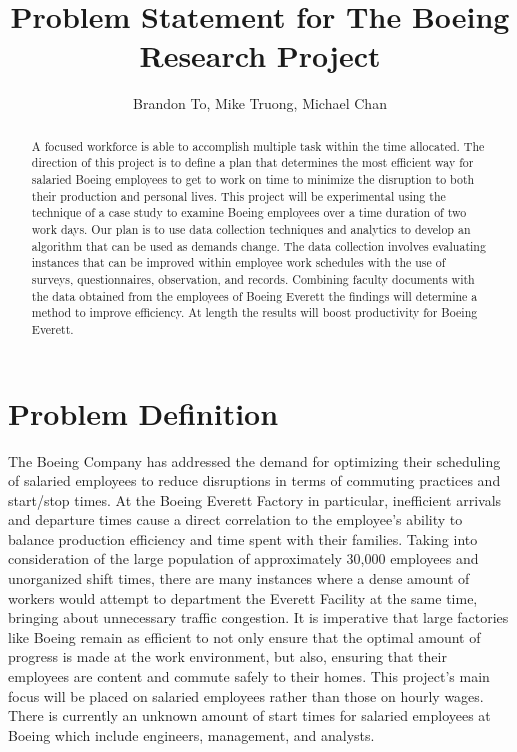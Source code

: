 \documentclass[journal, 11pt, letterpaper]{IEEEtran}
\title{Problem Statement for The Boeing Research Project{}}
\author{Brandon To, Mike Truong, Michael Chan}
\newcommand\tab[1][1cm]{\hspace*{#1}}
\begin{document}
\clearpage\maketitle
\thispagestyle{empty}


\begin{abstract}
\tab A focused workforce is able to accomplish multiple task within the time allocated. The direction of this project is to define a plan that determines the most efficient way for salaried Boeing employees to get to work on time to minimize the disruption to both their production and personal lives. This project will be experimental using the technique of a case study to examine Boeing employees over a time duration of two work days. 
Our plan is to use data collection techniques and analytics to develop an algorithm that can be used as demands change. 
The data collection involves evaluating instances that can be improved within employee work schedules with the use of surveys, questionnaires, observation, and records. 
Combining faculty documents with the data obtained from the employees of Boeing Everett the findings will determine a method to improve efficiency. At length the results will boost productivity for Boeing Everett. 
\end{abstract}


\newpage
\clearpage
\thispagestyle{empty}
\tableofcontents
\newpage


\setcounter{page}{1}




\section{Problem Definition}
\tab The Boeing Company has addressed the demand for optimizing their scheduling of salaried employees to reduce disruptions in terms of commuting practices and start/stop times. At the Boeing Everett Factory in particular, inefficient arrivals and departure times cause a direct correlation to the employee’s ability to balance production efficiency and time spent with their families.
Taking into consideration of the large population of approximately 30,000 employees and unorganized shift times, there are many instances where a dense amount of workers would attempt to department the Everett Facility at the same time, bringing about unnecessary traffic congestion.
It is imperative that large factories like Boeing remain as efficient to not only ensure that the optimal amount of progress is made at the work environment, but also, ensuring that their employees are content and commute safely to their homes.
\tab This project’s main focus will be placed on salaried employees rather than those on hourly wages. 
There is currently an unknown amount of start times for salaried employees at Boeing which include engineers, management, and analysts. 
\end{document}
